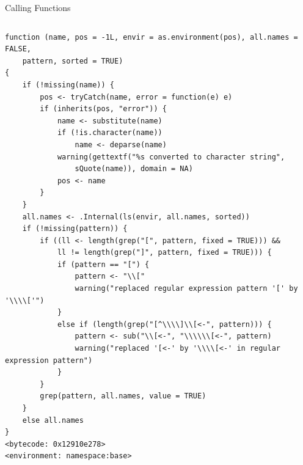 \documentclass[
  11pt,
  ignorenonframetext,
]{beamer}
\begin{document}
\begin{frame}[fragile]{Calling Functions}
\begin{columns}[T,onlytextwidth]
\begin{column}{0.48\textwidth}
\begin{verbatim}
function (name, pos = -1L, envir = as.environment(pos), all.names = FALSE, 
    pattern, sorted = TRUE) 
{
    if (!missing(name)) {
        pos <- tryCatch(name, error = function(e) e)
        if (inherits(pos, "error")) {
            name <- substitute(name)
            if (!is.character(name)) 
                name <- deparse(name)
            warning(gettextf("%s converted to character string", 
                sQuote(name)), domain = NA)
            pos <- name
        }
    }
    all.names <- .Internal(ls(envir, all.names, sorted))
    if (!missing(pattern)) {
        if ((ll <- length(grep("[", pattern, fixed = TRUE))) && 
            ll != length(grep("]", pattern, fixed = TRUE))) {
            if (pattern == "[") {
                pattern <- "\\["
                warning("replaced regular expression pattern '[' by  '\\\\['")
            }
            else if (length(grep("[^\\\\]\\[<-", pattern))) {
                pattern <- sub("\\[<-", "\\\\\\[<-", pattern)
                warning("replaced '[<-' by '\\\\[<-' in regular expression pattern")
            }
        }
        grep(pattern, all.names, value = TRUE)
    }
    else all.names
}
<bytecode: 0x12910e278>
<environment: namespace:base>
\end{verbatim}
\end{column}
\end{columns}
\end{frame}
\end{document}
